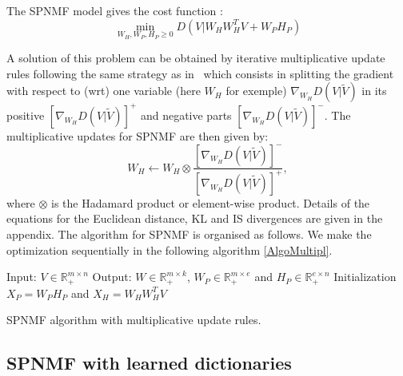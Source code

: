 \documentclass[journal]{IEEEtran}
\begin{document}
The SPNMF model gives the cost function : 
\begin{equation}\label{InitCost}
\min_{W_H,W_P,H_P \geq 0} D(V|W_{H}W_{H}^{T}V + W_{P} H_{P})  
\end{equation}

A solution of this problem can be obtained by iterative multiplicative update rules following the same strategy as in~\cite{yuanOja2005,Lee01algorithmsfor} which consists in splitting the gradient with respect to (wrt) one variable (here $W_H$ for exemple) $\nabla_{W_H} D(V|\tilde{V})$ in its positive $[\nabla_{W_H} D(V|\tilde{V})]^{+}$ and negative parts $[\nabla_{W_H} D(V|\tilde{V})]^{-}$.
The multiplicative updates for SPNMF are then given by: 
$$W_{H} \leftarrow W_{H} \otimes \frac{ [\nabla_{W_H} D(V|\tilde{V})]^{-} }{[\nabla_{W_H} D(V|\tilde{V})]^{+}}, $$
where $\otimes$ is the Hadamard product or element-wise product. Details of the equations for the Euclidean distance, KL and IS divergences are given in the appendix.  
The algorithm for SPNMF is organised as follows. We make the optimization sequentially in the following algorithm \ref{AlgoMultipl}.

\begin{algorithm}[h]
 Input: $V \in \mathbb{R}_{+}^{m \times n} $
 Output: $W \in \mathbb{R}_{+}^{m \times k}$, $W_P \in \mathbb{R}_+^{m \times e}$ and $H_P \in \mathbb{R}_{+}^{e \times n}$
 Initialization\;
 $ X_P = W_PH_P $ and
 $ X_H = W_HW_H^TV $ 
  
 \vspace{0.2cm}
 \caption{SPNMF algorithm with multiplicative update rules.}\label{AlgoMultipl}
\end{algorithm}


\subsection{SPNMF with learned dictionaries}\label{fixedict}  
\end{document}
